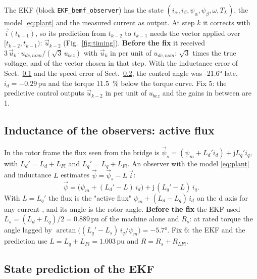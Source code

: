 \documentclass[10pt,a4paper]{scrartcl}
\newcommand{\jj}{\mathrm{j}}
\newcommand{\pu}{\,\mathrm{pu}}
\newcommand{\code}[1]{\texttt{#1}}
\newcommand{\ub}{u_{bez}}
\newcommand{\udcn}{u_{dc,nom}}
\begin{document}
\begin{onehalfspace}
The EKF (block \code{EKF\_bemf\_observer}) has the state $(i_\alpha, i_\beta, \psi_\alpha, \psi_\beta, \omega, T_L)$, the model \eqref{eq:plant} and the measured current as output. At step $k$ it corrects with $\vec i(t_{k-1})$, so its prediction from $t_{k-2}$ to $t_{k-1}$ needs the vector applied over $[t_{k-2}, t_{k-1})$: $\vec u_{k-2}$ (Fig.~\ref{fig:timing}). \textbf{Before the fix} it received $3\,\vec u_k\cdot\udcn/(\sqrt3\,\ub)$ with $\vec u_k$ in per unit of $\udcn$: $\sqrt3$ times the true voltage, and of the vector chosen in that step. With the inductance error of Sect.~\ref{sec:activeflux} and the speed error of Sect.~\ref{sec:prediction}, the control angle was \ang{-21.6} late, $i_d = -0.29\pu$ and the torque \SI{11.5}{\percent} below the torque curve. Fix 5: the predictive control outputs $\vec u_{k-2}$ in per unit of $\ub$ and the gains in between are 1.

\subsection{Inductance of the observers: active flux}
\label{sec:activeflux}

In the rotor frame the flux seen from the bridge is $\vec\psi_s = (\psi_m + L_d' i_d) + \jj L_q' i_q$, with $L_d' = L_d + L_{Fi}$ and $L_q' = L_q + L_{Fi}$. An observer with the model \eqref{eq:plant} and inductance $L$ estimates $\vec\psi = \vec\psi_s - L\,\vec i$:
\begin{equation}
\vec\psi = \big(\psi_m + (L_d' - L)\,i_d\big) + \jj\,(L_q' - L)\,i_q .
\label{eq:activeflux}
\end{equation}
With $L = L_q'$ the flux is the "active flux" $\psi_m + (L_d - L_q)\,i_d$ on the d axis for any current \cite{boldea2008}, and its angle is the rotor angle. \textbf{Before the fix} the EKF used $L_s = (L_d + L_q)/2 = 0.889\pu$ of the machine alone and $R_s$: at rated torque the angle lagged by $\arctan\big((L_q' - L_s)\,i_q/\psi_m\big) = \ang{-5.7}$. Fix 6: the EKF and the prediction use $L = L_q + L_{Fi} = 1.003\pu$ and $R = R_s + R_{LFi}$.

\subsection{State prediction of the EKF}
\label{sec:prediction}


\end{onehalfspace}
\end{document}
